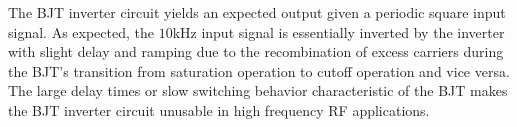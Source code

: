 The BJT inverter circuit yields an expected output given a periodic square input signal. As expected, the $10$\si{\kilo\hertz} input signal is essentially inverted by the inverter with slight delay and ramping due to the recombination of excess carriers during the BJT's transition from saturation operation to cutoff operation and vice versa. The large delay times or slow switching behavior characteristic of the BJT makes the BJT inverter circuit unusable in high frequency RF applications. 
